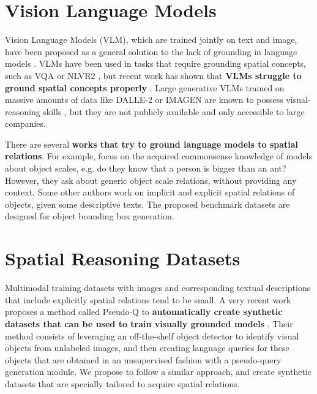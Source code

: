 \section{Vision Language Models} \label{sec:vision_language_models}

Vision Language Models (VLM), which are trained jointly on text and image, have been proposed as a general solution to the lack of grounding in language models \cite{lu2019vilbert, tan2020lxmert, ramesh2022hierarchical, saharia2022photorealistic}. VLMs have been used in tasks that require grounding spatial concepts, such as VQA \cite{antol2015vqa} or NLVR2 \cite{suhr2018corpus}, but recent work has shown that \textbf{VLMs struggle to ground spatial concepts properly} \cite{liu2022things}. Large generative VLMs trained on massive amounts of data like DALLE-2 \cite{ramesh2022hierarchical} or IMAGEN \cite{saharia2022photorealistic} are known to possess visual-reasoning skills \cite{cho2022dall}, but they are not publicly available and only accessible to large companies.

There are several \textbf{works that try to ground language models to spatial relations}. For example, \cite{bagherinezhad2016elephants, elazar2019large} focus on the acquired commonsense knowledge of models about object scales, e.g. do they know that a person is bigger than an ant? However, they ask about generic object scale relations, without providing any context. Some other authors \cite{collell2018acquiring, elu2021inferring} work on implicit and explicit spatial relations of objects, given some descriptive texts. The proposed benchmark datasets are designed for object bounding box generation.

\section{Spatial Reasoning Datasets} \label{sec:spatial_reasoning_datasets}

Multimodal training datasets with images and corresponding textual descriptions that include explicitly spatial relations tend to be small. A very recent work proposes a method called Pseudo-Q to \textbf{automatically create synthetic datasets that can be used to train visually grounded models} \cite{jiang2022pseudo}. Their method consists of leveraging an off-the-shelf object detector to identify visual objects from unlabeled images, and then creating language queries for these objects that are obtained in an unsupervised fashion with a pseudo-query generation module. We propose to follow a similar approach, and create synthetic datasets that are specially tailored to acquire spatial relations.

